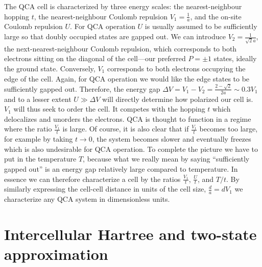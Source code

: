 The QCA cell is characterized by three energy scales: the nearest-neighbour
hopping $t$, the nearest-neighbour Coulomb repulsion $V_1 = \frac{1}{a}$, and
the on-site Coulomb repulsion $U$. For QCA operation $U$ is usually assumed to
be sufficiently large so that doubly occupied states are gapped out. We can
introduce $V_2 = \frac{1}{\sqrt{2} a}$, the next-nearest-neighbour Coulomb
repulsion, which corresponds to both electrons sitting on the diagonal of the
cell---our preferred $P=\pm1$ states, ideally the ground state. Conversely,
$V_1$ corresponds to both electrons occupying the edge of the cell. Again, for
QCA operation we would like the edge states to be sufficiently gapped out.
Therefore, the energy gap $\Delta V = V_1 - V_2 = \frac{2 - \sqrt{2}}{2 a} \sim
0.3 V_1$ and to a lesser extent $U \gg \Delta V$ will directly determine how
polarized our cell is. $V_1$ will thus seek to order the cell. It competes with
the hopping $t$ which delocalizes and unorders the electrons. QCA is thought to
function in a regime where the ratio $\frac{V_1}{t}$ is large. Of course, it is
also clear that if $\frac{V_1}{t}$ becomes too large, for example by taking $t
\rightarrow 0$, the system becomes slower and eventually freezes which is also
undesirable for QCA operation. To complete the picture we have to put in the
temperature $T$, because what we really mean by saying ``sufficiently gapped
out'' is an energy gap relatively large compared to temperature. In essence we
can therefore characterize a cell by the ratios $\frac{V_1}{t}$, $\frac{U}{t}$,
and $T/t$. By similarly expressing the cell-cell distance in units of the cell
size, $\frac{d}{a} = d V_1$ we characterize any QCA system in dimensionless
units.


\section{Intercellular Hartree and two-state approximation}

